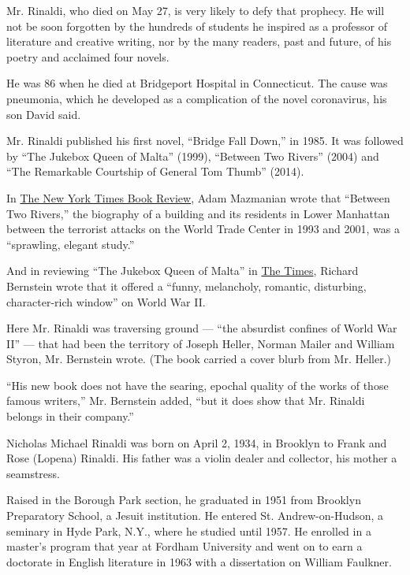 Mr. Rinaldi, who died on May 27, is very likely to defy that prophecy.
He will not be soon forgotten by the hundreds of students he inspired as
a professor of literature and creative writing, nor by the many readers,
past and future, of his poetry and acclaimed four novels.

He was 86 when he died at Bridgeport Hospital in Connecticut. The cause
was pneumonia, which he developed as a complication of the novel
coronavirus, his son David said.

Mr. Rinaldi published his first novel, ``Bridge Fall Down,'' in 1985. It
was followed by ``The Jukebox Queen of Malta'' (1999), ``Between Two
Rivers'' (2004) and ``The Remarkable Courtship of General Tom Thumb''
(2014).

In
\href{https://www.nytimes.com/2004/06/20/books/books-in-brief-fiction-937886.html}{The
New York Times Book Review}, Adam Mazmanian wrote that ``Between Two
Rivers,'' the biography of a building and its residents in Lower
Manhattan between the terrorist attacks on the World Trade Center in
1993 and 2001, was a ``sprawling, elegant study.''

And in reviewing ``The Jukebox Queen of Malta'' in
\href{https://www.nytimes.com/1999/07/14/books/books-of-the-times-the-attractions-of-malta-don-t-include-egg-creams.html}{The
Times}, Richard Bernstein wrote that it offered a ``funny, melancholy,
romantic, disturbing, character-rich window'' on World War II.

Here Mr. Rinaldi was traversing ground --- ``the absurdist confines of
World War II'' --- that had been the territory of Joseph Heller, Norman
Mailer and William Styron, Mr. Bernstein wrote. (The book carried a
cover blurb from Mr. Heller.)

``His new book does not have the searing, epochal quality of the works
of those famous writers,'' Mr. Bernstein added, ``but it does show that
Mr. Rinaldi belongs in their company.''

Nicholas Michael Rinaldi was born on April 2, 1934, in Brooklyn to Frank
and Rose (Lopena) Rinaldi. His father was a violin dealer and collector,
his mother a seamstress.

Raised in the Borough Park section, he graduated in 1951 from Brooklyn
Preparatory School, a Jesuit institution. He entered St.
Andrew-on-Hudson, a seminary in Hyde Park, N.Y., where he studied until
1957. He enrolled in a master's program that year at Fordham University
and went on to earn a doctorate in English literature in 1963 with a
dissertation on William Faulkner.

